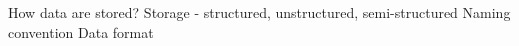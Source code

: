 How data are stored?
Storage - structured, unstructured, semi-structured
Naming convention
Data format
